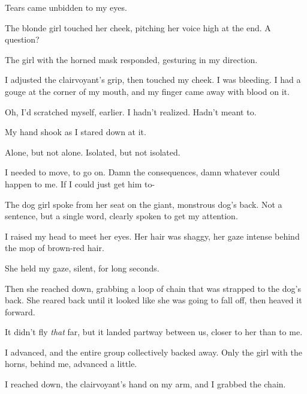Tears came unbidden to my eyes.



The blonde girl touched her cheek, pitching her voice high at the end.  A question?



The girl with the horned mask responded, gesturing in my direction.



I adjusted the clairvoyant's grip, then touched my cheek.  I was bleeding.  I had a gouge at the corner of my mouth, and my finger came away with blood on it.



Oh, I'd scratched myself, earlier.  I hadn't realized.  Hadn't meant to.



My hand shook as I stared down at it.



Alone, but not alone.  Isolated, but not isolated.



I needed to move, to go on.  Damn the consequences, damn whatever could happen to me.  If I could just get him to-



The dog girl spoke from her seat on the giant, monstrous dog's back.  Not a sentence, but a single word, clearly spoken to get my attention.



I raised my head to meet her eyes.  Her hair was shaggy, her gaze intense behind the mop of brown-red hair.



She held my gaze, silent, for long seconds.



Then she reached down, grabbing a loop of chain that was strapped to the dog's back.  She reared back until it looked like she was going to fall off, then heaved it forward.



It didn't fly \emph{that} far, but it landed partway between us, closer to her than to me.



I advanced, and the entire group collectively backed away.  Only the girl with the horns, behind me, advanced a little.



I reached down, the clairvoyant's hand on my arm, and I grabbed the chain.



